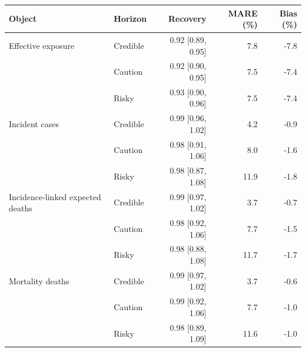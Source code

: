 \begingroup
\renewcommand{\arraystretch}{1.08}
\setlength{\tabcolsep}{4pt}
\begin{tabular}{llrrr}
\toprule
Object & Horizon & Recovery & MARE (\%) & Bias (\%) \\
\midrule
Effective exposure & Credible & 0.92 [0.89, 0.95] & 7.8 & -7.8 \\
 & Caution & 0.92 [0.90, 0.95] & 7.5 & -7.4 \\
 & Risky & 0.93 [0.90, 0.96] & 7.5 & -7.4 \\
\midrule
Incident cases & Credible & 0.99 [0.96, 1.02] & 4.2 & -0.9 \\
 & Caution & 0.98 [0.91, 1.06] & 8.0 & -1.6 \\
 & Risky & 0.98 [0.87, 1.08] & 11.9 & -1.8 \\
\midrule
Incidence-linked expected deaths & Credible & 0.99 [0.97, 1.02] & 3.7 & -0.7 \\
 & Caution & 0.98 [0.92, 1.06] & 7.7 & -1.5 \\
 & Risky & 0.98 [0.88, 1.08] & 11.7 & -1.7 \\
\midrule
Mortality deaths & Credible & 0.99 [0.97, 1.02] & 3.7 & -0.6 \\
 & Caution & 0.99 [0.92, 1.06] & 7.7 & -1.0 \\
 & Risky & 0.98 [0.89, 1.09] & 11.6 & -1.0 \\
\bottomrule
\end{tabular}
\endgroup
